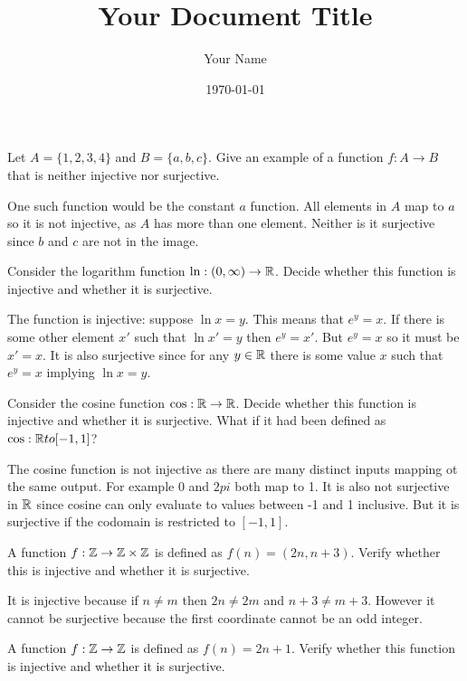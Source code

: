 \documentclass{article}
\title{Your Document Title}
\author{Your Name}
\date{\today} %
\begin{document}
\maketitle

\begin{problem}
Let $A = \{1, 2, 3, 4\}$ and $B = \{a, b, c\}$. Give an example of a function $f: A \to B$ that is neither injective nor surjective.
\end{problem}

One such function would be the constant $a$ function. All elements in $A$ map to $a$ so it is not injective, as $A$ has more than one element. Neither is it surjective since $b$ and $c$ are not in the image.

\begin{problem}
Consider the logarithm function $\ln : (0, \infty) \to \mathbb{R}$. Decide whether this function is injective and whether it is surjective.
\end{problem}

The function is injective: suppose $\ln x = y$. This means that $e^y = x$. If there is some other element $x'$ such that $\ln x' = y$ then $e^y = x'$. But $e^y = x$ so it must be $x' = x$. It is also surjective since for any $y \in \mathbb{R}$ there is some value $x$ such that $e^y = x$ implying $\ln x = y$.

\begin{problem}
Consider the cosine function $\cos: \mathbb{R} \to \mathbb{R}$. Decide whether this function is injective and whether it is surjective. What if it had been defined as $\cos: \mathbb{R} to [-1, 1]$?
\end{problem}

The cosine function is not injective as there are many distinct inputs mapping ot the same output. For example 0 and $2pi$ both map to 1. It is also not surjective in $\mathbb{R}$ since cosine can only evaluate to values between -1 and 1 inclusive. But it is surjective if the codomain is restricted to $[-1, 1]$.

\begin{problem}
A function $f: \mathbb{Z} \to \mathbb{Z} \times \mathbb{Z}$ is defined as $f(n) = (2n, n + 3)$. Verify whether this is injective and whether it is surjective.
\end{problem}

It is injective because if $n \neq m$ then $2n \neq 2m$ and $n +3 \neq m + 3$. However it cannot be surjective because the first coordinate cannot be an odd integer.

\begin{problem}
A function $f: \mathbb{Z} \to \mathbb{Z}$ is defined as $f(n) = 2n + 1$. Verify whether this function is injective and whether it is surjective.
\end{problem}
\end{document}
